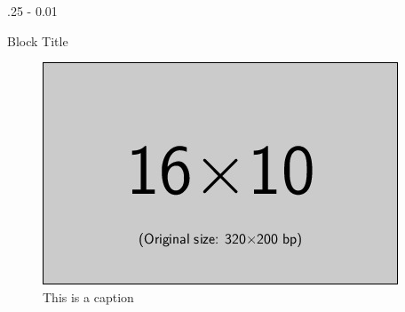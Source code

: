 \documentclass{postertheme}\usepackage[]{graphicx}\usepackage[]{color}
\begin{document}
\begin{frame}
\begin{columns}[onlytextwidth]
\begin{column}{.25 \textwidth - 0.01 \textwidth}
\begin{block}{Block Title}
          \begin{figure}
            \includegraphics[scale=1]{figures/example-image-16x10.jpg}
            \caption{This is a caption}
          \end{figure}

    \end{block}
  \end{column}

\end{columns}


\begin{columns}[onlytextwidth]
  

\end{columns}
\end{frame}
\end{document}
